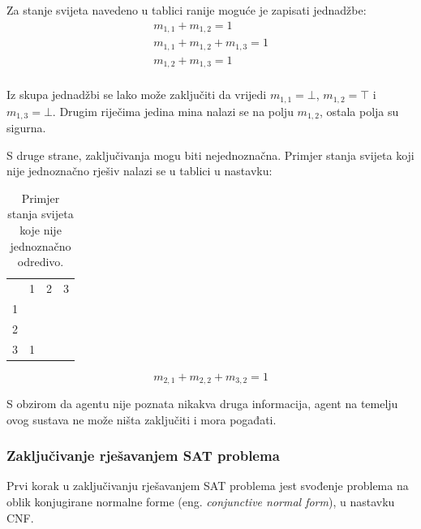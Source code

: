 \documentclass{article}
\begin{document}
Za stanje svijeta navedeno u tablici ranije moguće je zapisati jednadžbe:
\begin{align*}
    m_{1, 1} + m_{1, 2} = 1 \\
    m_{1, 1} + m_{1, 2} + m_{1, 3} = 1 \\
    m_{1, 2} + m_{1, 3} = 1 \\
\end{align*}

Iz skupa jednadžbi se lako može zaključiti da vrijedi $m_{1, 1} = \bot$, $m_{1, 2} = \top$ i
$m_{1, 3} = \bot$. Drugim riječima jedina mina nalazi se na polju $m_{1, 2}$, ostala polja su
sigurna.

S druge strane, zaključivanja mogu biti nejednoznačna. Primjer stanja svijeta koji nije
jednoznačno rješiv nalazi se u tablici u nastavku:
\begin{table}[ht]
    \centering
    \begin{tabular}{llll}
                           & 1                      & 2                     & 3                     \\ \cline{2-4}
    \multicolumn{1}{l|}{1} & \multicolumn{1}{l|}{}  & \multicolumn{1}{l|}{} & \multicolumn{1}{l|}{} \\ \cline{2-4}
    \multicolumn{1}{l|}{2} & \multicolumn{1}{l|}{}  & \multicolumn{1}{l|}{} & \multicolumn{1}{l|}{} \\ \cline{2-4}
    \multicolumn{1}{l|}{3} & \multicolumn{1}{l|}{1} & \multicolumn{1}{l|}{} & \multicolumn{1}{l|}{} \\ \cline{2-4}
    \end{tabular}
    \label{table:state2}
    \caption{Primjer stanja svijeta koje nije jednoznačno odredivo.}
\end{table}

\begin{equation}
    m_{2, 1} + m_{2, 2} + m_{3, 2} = 1
    \label{eq:state2}
\end{equation}

S obzirom da agentu nije poznata nikakva druga informacija, agent na temelju ovog sustava ne
može ništa zaključiti i mora pogađati.

\subsubsection{Zaključivanje rješavanjem SAT problema}
Prvi korak u zaključivanju rješavanjem SAT problema jest svođenje
problema na oblik konjugirane normalne forme (eng. \textit{conjunctive normal form}), u nastavku CNF.
\end{document}
